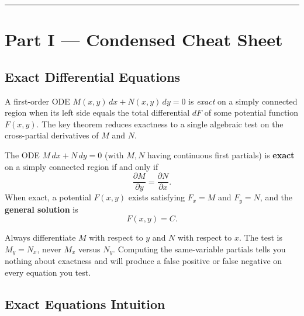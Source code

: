 \vspace{0.6em}
\hrule
\vspace{0.6em}

{}
\section*{Part I --- Condensed Cheat Sheet}
\setcounter{section}{7}   %

\subsection{Exact Differential Equations}

A first-order ODE $M(x,y)\,dx + N(x,y)\,dy = 0$ is \emph{exact} on a simply
connected region when its left side equals the total differential $dF$ of some
potential function $F(x,y)$. The key theorem reduces exactness to a single
algebraic test on the cross-partial derivatives of $M$ and $N$.

\begin{formulabox}
The ODE $M\,dx + N\,dy = 0$ (with $M,N$ having continuous first partials) is
\textbf{exact} on a simply connected region if and only if
\[
  \frac{\partial M}{\partial y} = \frac{\partial N}{\partial x}.
\]
When exact, a potential $F(x,y)$ exists satisfying $F_x = M$ and $F_y = N$,
and the \textbf{general solution} is
\[
  F(x,y) = C.
\]
\end{formulabox}

\begin{warningbox}
Always differentiate $M$ with respect to \textbf{$y$} and $N$ with respect to
\textbf{$x$}. The test is $M_y = N_x$, never $M_x$ versus $N_y$. Computing the
same-variable partials tells you nothing about exactness and will produce a
false positive or false negative on every equation you test.
\end{warningbox}

\subsection{Exact Equations Intuition}

